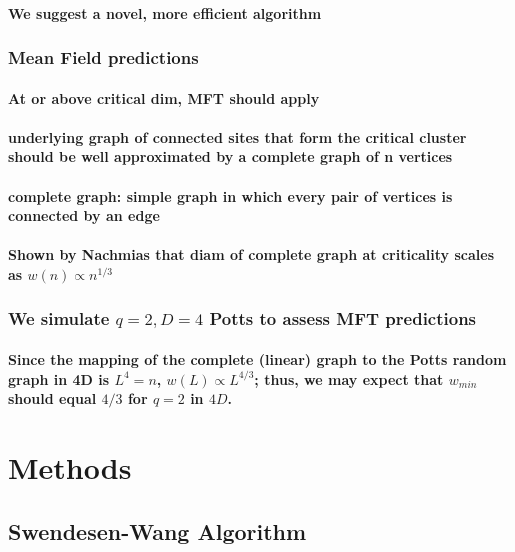 \documentclass[pre,preprint]{revtex4-1}
\begin{document}
\paragraph{We suggest a novel, more efficient algorithm}
\label{sec-1.3.4.2}
\subsubsection{Mean Field predictions}
\label{sec-1.3.5}
\paragraph{At or above critical dim, MFT should apply}
\label{sec-1.3.5.1}
\paragraph{underlying graph of connected sites that form the critical cluster should be well approximated by a complete graph of n vertices}
\label{sec-1.3.5.2}
\paragraph{complete graph:  simple graph in which every pair of vertices is connected by an edge}
\label{sec-1.3.5.3}
\paragraph{Shown by Nachmias \cite{Nachmiasa} that diam of complete graph at criticality scales as $w(n) \propto n^{1/3}$}
\label{sec-1.3.5.4}
\subsubsection{We simulate $q=2, D=4$ Potts to assess MFT predictions}
\label{sec-1.3.6}
\paragraph{Since the mapping of the complete (linear) graph to the Potts random graph in 4D is $L^4=n$, $w(L) \propto L^{4/3}$; thus, we may expect that $w_{min}$ should equal $4/3$ for $q=2$ in $4D$.}
\label{sec-1.3.6.1}
\section{Methods}
\label{sec-2}
\subsection{Swendesen-Wang Algorithm}
\label{sec-2.1}
\end{document}
